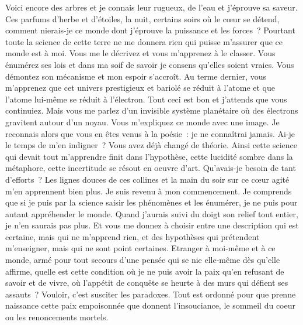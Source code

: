 \documentclass{book}
\begin{document}
Voici encore des arbres et je connais leur rugueux, de l'eau et j'éprouve sa saveur. Ces parfums d'herbe et d'étoiles, la nuit, certains soirs où le cœur se détend, comment nierais-je ce monde dont j'éprouve la puissance et les forces ? Pourtant toute la science de cette terre ne me donnera rien qui puisse m'assurer que ce monde est à moi. Vous me le décrivez et vous m'apprenez à le classer. Vous énumérez ses lois et dans ma soif de savoir je consens qu'elles soient vraies. Vous démontez son mécanisme et mon espoir s'accroît. Au terme dernier, vous m'apprenez que cet univers prestigieux et bariolé se réduit à l'atome et que l'atome lui‑même se réduit à l'électron. Tout ceci est bon et j'attends que vous continuiez. Mais vous me parlez d'un invisible système planétaire où des électrons gravitent autour d'un noyau. Vous m'expliquez ce monde avec une image. Je reconnais alors que vous en êtes venus à la poésie : je ne connaîtrai jamais. Ai-je le temps de m’en indigner ? Vous avez déjà changé de théorie. Ainsi cette science qui devait tout m'apprendre finit dans l'hypothèse, cette lucidité sombre dans la métaphore, cette incertitude se résout en oeuvre d'art. Qu'avais-je besoin de tant d'efforts ? Les lignes douces de ces collines et la main du soir sur ce cœur agité m'en apprennent bien plus. Je suis revenu à mon commencement. Je comprends que si je puis par la science saisir les phénomènes et les énumérer, je ne puis pour autant appréhender le monde. Quand j'aurais suivi du doigt son relief tout entier, je n'en saurais pas plus. Et vous me donnez à choisir entre une description qui est certaine, mais qui ne m'apprend rien, et des hypothèses qui prétendent m'enseigner, mais qui ne sont point certaines. Etranger à moi‑même et à ce monde, armé pour tout secours d'une pensée qui se nie elle‑même dès qu'elle affirme, quelle est cette condition où je ne puis avoir la paix qu'en refusant de savoir et de vivre, où l'appétit de conquête se heurte à des murs qui défient ses assauts ? Vouloir, c'est susciter les paradoxes. Tout est ordonné pour que prenne naissance cette paix empoisonnée que donnent l'insouciance, le sommeil du coeur ou les renoncements mortels.
\end{document}
